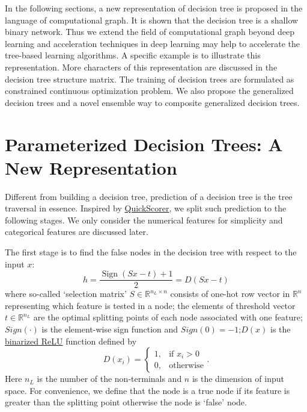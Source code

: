 \documentclass[UTF8]{article}
\begin{document}
In the following sections, a new representation of decision tree is proposed in the language of computational graph.
It is shown that the decision tree is a shallow binary network.
Thus we extend the field of computational graph beyond deep learning
and acceleration techniques in deep learning may help to accelerate the tree-based learning algorithms.
A specific example is to illustrate this representation.
More characters of  this representation are discussed in the decision tree structure matrix.
The training of decision trees are formulated as constrained continuous optimization problem.
We also propose the generalized decision trees and a novel ensemble way to composite generalized decision trees.


\section{Parameterized Decision Trees: A New Representation}


Different from building a decision tree, prediction of a decision tree is the tree traversal in essence.
Inspired by \href{http://pages.di.unipi.it/rossano/wp-content/uploads/sites/7/2015/11/sigir15.pdf}{QuickScorer},
we split such prediction to the following stages.
We only consider the numerical features for simplicity and categorical features are discussed later.

The first stage is to  find the false nodes in the decision tree with respect to the input $x$:
   \begin{equation}h=\frac{\operatorname{Sign}(Sx-t)+1}{2}=D(Sx-t)\end{equation}
where so-called `selection matrix' $S\in\mathbb{R}^{n_L\times n}$ consists of one-hot row vector in $\mathbb{R}^n$
representing which feature is tested in a node;
the elements of threshold vector $t\in\mathbb{R}^{n_L}$ are the optimal splitting points of each node associated with one feature;
$Sign(\cdot)$ is the element-wise sign function
and $Sign(0)=-1$;$D(x)$ is the \href{https://arxiv.org/pdf/1901.09731.pdf}{binarized ReLU} function defined by
$$
D(x_i)=\begin{cases}1, &\text{if $x_i> 0$}\\
0, &\text{otherwise}\end{cases}.
$$
Here $n_L$ is the number of the non-terminals and $n$ is the dimension of input space.
For convenience, we define that the node is a true node if its feature is greater than the splitting point
otherwise the node is `false' node.
\end{document}
